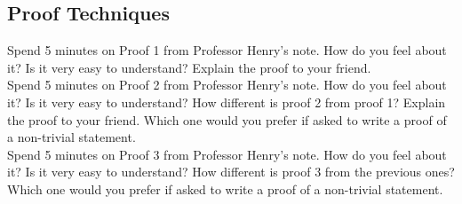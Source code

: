 \documentclass[11pt, oneside]{article}   	%
\begin{document}
\subsection{Proof Techniques}
Spend 5 minutes on Proof 1 from Professor Henry's note. How do you feel about it? Is it very easy to understand? Explain the proof to your friend.\\
Spend 5 minutes on Proof 2 from Professor Henry's note. How do you feel about it? Is it very easy to understand? How different is proof 2 from proof 1?
Explain the proof to your friend. Which one would you prefer if asked to write a proof of a non-trivial statement.\\
Spend 5 minutes on Proof 3 from Professor Henry's note. How do you feel about it? Is it very easy to understand? How different is proof 3 from the previous ones?
Which one would you prefer if asked to write a proof of a non-trivial statement.\\
\end{document}
